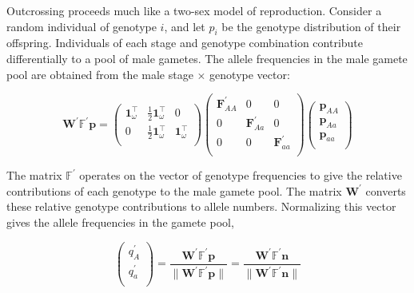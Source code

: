 \documentclass[11pt]{article}
\def\mbf#1{\mathbf{#1}}
\def\mbb#1{\mathbb{#1}}
\begin{document}
Outcrossing proceeds much like a two-sex model of reproduction. Consider a random individual of genotype $i$, and let $p_i$ be the genotype distribution of their offspring. Individuals of each stage and genotype combination contribute differentially to a pool of male gametes. The allele frequencies in the male gamete pool are obtained from the male stage $\times$ genotype vector:

\begin{equation}
	\mbf{W}^{\prime} \mbb{F}^{\prime} \mbf{p} = 
		\left(
			\begin{array}{ccc}
				\mbf{1}^{\intercal}_{\omega} & \frac{1}{2} \mbf{1}^{\intercal}_{\omega} & 0 \\
				0 & \frac{1}{2} \mbf{1}^{\intercal}_{\omega} & \mbf{1}^{\intercal}_{\omega} \\
			\end{array} \right)
		\left(
			\begin{array}{ccc}
				\mbf{F}^{\prime}_{AA} & 0 & 0 \\
				0 & \mbf{F}^{\prime}_{Aa} & 0 \\
				0 & 0 & \mbf{F}^{\prime}_{aa} \\
			\end{array} \right)
		\left(
			\begin{array}{c}
				\mbf{p}_{AA} \\
				\mbf{p}_{Aa} \\
				\mbf{p}_{aa} \\
			\end{array} \right)
\end{equation}

\noindent The matrix $\mbb{F}^{\prime}$ operates on the vector of genotype frequencies to give the relative contributions of each genotype to the male gamete pool. The matrix $\mbf{W}^{\prime}$ converts these relative genotype contributions to allele numbers. Normalizing this vector gives the allele frequencies in the gamete pool,

\begin{equation} \label{eq:maleGametePool}
	\left(
		\begin{array}{c}
			q^{\prime}_{A} \\
			q^{\prime}_{a} \\
		\end{array} \right) = 
			\frac{\mbf{W}^{\prime} \mbb{F}^{\prime} \mbf{p}}{\| \mbf{W}^{\prime} \mbb{F}^{\prime} \mbf{p} \|} = 
				\frac{\mbf{W}^{\prime} \mbb{F}^{\prime} \mbf{n}}{\| \mbf{W}^{\prime} \mbb{F}^{\prime} \mbf{n} \|}
\end{equation}
\end{document}
